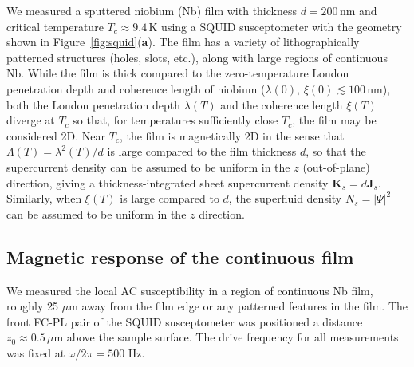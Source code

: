 \documentclass[%
 reprint,
 superscriptaddress,
 amsmath,
 amssymb,
 amsfonts,
 aps,
 prb,
]{revtex4-2}
\newcommand{\Tc}{T_c}
\newcommand{\um}{\mu\mathrm{m}}
\newcommand{\nm}{\mathrm{nm}}
\renewcommand{\vec}{\mathbf}
\begin{document}
We measured a sputtered niobium (Nb) film with thickness $d=200\,\nm$ and critical temperature $\Tc\approx9.4\,\mathrm{K}$ using a SQUID susceptometer with the geometry shown in Figure~\ref{fig:squid}({\bf a}). The film has a variety of lithographically patterned structures (holes, slots, etc.), along with large regions of continuous Nb. While the film is thick compared to the zero-temperature London penetration depth and coherence length of niobium ($\lambda(0),\,\xi(0) \lesssim 100\,\mathrm{nm}$), both the London penetration depth $\lambda(T)$ and the coherence length $\xi(T)$ diverge at $\Tc$ so that, for temperatures sufficiently close $\Tc$, the film may be considered 2D. Near $\Tc$, the film is magnetically 2D in the sense that $\Lambda(T)=\lambda^2(T)/d$ is large compared to the film thickness $d$, so that the supercurrent density can be assumed to be uniform in the $z$ (out-of-plane) direction, giving a thickness-integrated sheet supercurrent density $\vec{K}_s=d\vec{J}_s$. Similarly, when $\xi(T)$ is large compared to $d$, the superfluid density $N_s=|\Psi|^2$ can be assumed to be uniform in the $z$ direction.

\subsection{Magnetic response of the continuous film}


We measured the local AC susceptibility in a region of continuous Nb film, roughly 25 $\um$ away from the film edge or any patterned features in the film. The front FC-PL pair of the SQUID susceptometer was positioned a distance $z_0\approx 0.5\,\um$ above the sample surface. The drive frequency for all measurements was fixed at $\omega/2\pi=500$ Hz. 
\end{document}
